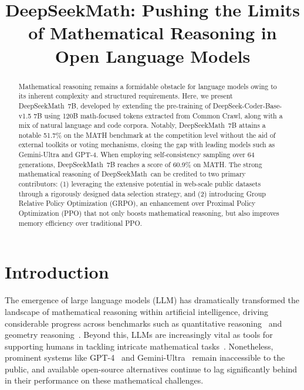 \title{DeepSeekMath: Pushing the Limits of Mathematical Reasoning in Open Language Models}

\begin{abstract}
Mathematical reasoning remains a formidable obstacle for language models owing to its inherent complexity and structured requirements. Here, we present DeepSeekMath~7B, developed by extending the pre-training of DeepSeek-Coder-Base-v1.5 7B using 120B math-focused tokens extracted from Common Crawl, along with a mix of natural language and code corpora. Notably, DeepSeekMath~7B attains a notable 51.7\% on the MATH benchmark at the competition level without the aid of external toolkits or voting mechanisms, closing the gap with leading models such as Gemini-Ultra and GPT-4. When employing self-consistency sampling over 64 generations, DeepSeekMath~7B reaches a score of 60.9\% on MATH. The strong mathematical reasoning of DeepSeekMath~can be credited to two primary contributors: (1) leveraging the extensive potential in web-scale public datasets through a rigorously designed data selection strategy, and (2) introducing Group Relative Policy Optimization (GRPO), an enhancement over Proximal Policy Optimization (PPO) that not only boosts mathematical reasoning, but also improves memory efficiency over traditional PPO.
\end{abstract}

\section{Introduction}

The emergence of large language models (LLM) has dramatically transformed the landscape of mathematical reasoning within artificial intelligence, driving considerable progress across benchmarks such as quantitative reasoning~\citep{MATH} and geometry reasoning~\citep{trinh2024solving}. Beyond this, LLMs are increasingly vital as tools for supporting humans in tackling intricate mathematical tasks~\citep{tao}. Nonetheless, prominent systems like GPT-4~\citep{gpt4} and Gemini-Ultra~\citep{gemini} remain inaccessible to the public, and available open-source alternatives continue to lag significantly behind in their performance on these mathematical challenges.

